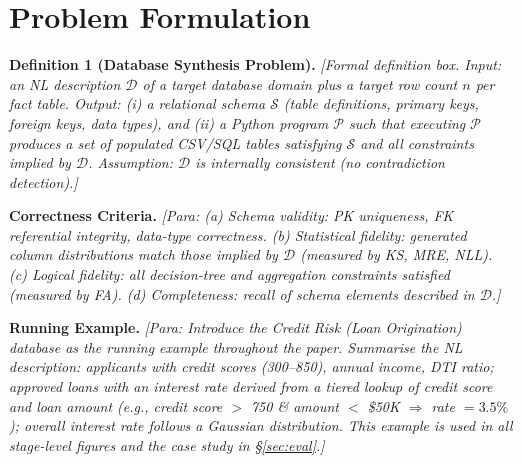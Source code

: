 \section{Problem Formulation}

\noindent\textbf{Definition 1 (Database Synthesis Problem).}
\textit{[Formal definition box. Input: an NL description $\mathcal{D}$ of a target database
domain plus a target row count $n$ per fact table.
Output: (i) a relational schema $\mathcal{S}$ (table definitions, primary keys, foreign keys,
data types), and (ii) a Python program $\mathcal{P}$ such that executing $\mathcal{P}$
produces a set of populated CSV/SQL tables satisfying $\mathcal{S}$ and all constraints
implied by $\mathcal{D}$.
Assumption: $\mathcal{D}$ is internally consistent (no contradiction detection).]}

\medskip
\noindent\textbf{Correctness Criteria.}
\textit{[Para: (a) Schema validity: PK uniqueness, FK referential integrity, data-type
correctness.
(b) Statistical fidelity: generated column distributions match those implied by $\mathcal{D}$
(measured by KS, MRE, NLL).
(c) Logical fidelity: all decision-tree and aggregation constraints satisfied
(measured by FA).
(d) Completeness: recall of schema elements described in $\mathcal{D}$.]}

\medskip
\noindent\textbf{Running Example.}
\textit{[Para: Introduce the \emph{Credit Risk (Loan Origination)} database as the running
example throughout the paper.
Summarise the NL description: applicants with credit scores (300--850), annual income, DTI
ratio; approved loans with an interest rate derived from a tiered lookup of credit score and
loan amount (e.g., credit score $>$ 750 \& amount $<$ \$50K $\Rightarrow$ rate $= 3.5\%$);
overall interest rate follows a Gaussian distribution.
This example is used in all stage-level figures and the case study in \S\ref{sec:eval}.]}
